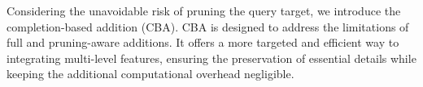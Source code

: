 
Considering the unavoidable risk of pruning the query target, we introduce the completion-based addition (CBA). CBA is designed to address the limitations of full and pruning-aware additions. It offers a more targeted and efficient way to integrating multi-level features, ensuring the preservation of essential details while keeping the additional computational overhead negligible.



